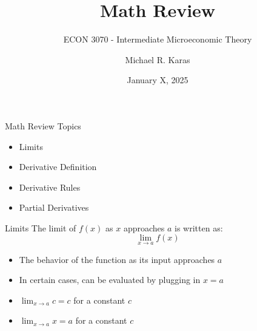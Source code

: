 \documentclass[aspectratio=169]{beamer}
\author{Michael R. Karas}
\title{Math Review}
\subtitle{ECON 3070 - Intermediate Microeconomic Theory}
\date{January X, 2025}
\begin{document}
\begin{frame}
  \titlepage
\end{frame}

\begin{frame}{Math Review Topics}\label{main1}
\begin{itemize}
	\begin{itemize}
		\item Limits
		\item Derivative Definition
		\item Derivative Rules
		\item Partial Derivatives
	\end{itemize}
\end{itemize}

\end{frame}

\begin{frame}{Limits}\label{main1}
	The limit of \( f(x) \) as \( x \) approaches \( a \) is written as:
\[
\lim_{x \to a} f(x)
\]
\begin{itemize}
\begin{itemize}
	\item The behavior of the function as its input approaches \( a \)
	\item In certain cases, can be evaluated by plugging in \( x = a \)
	\item \( \lim_{x \to a} c = c \) for a constant \( c \)
	\item \(\lim_{x \to a} x = a \) for a constant \( c \)
\end{itemize}
\end{itemize}

\end{frame}
\end{document}
